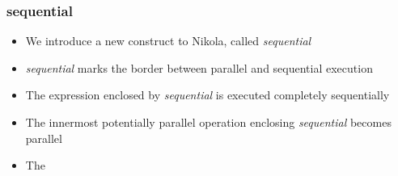 \documentclass[a4paper]{beamer}
\begin{document}
\begin{frame}
  \frametitle{sequential}


  \begin{itemize}
    \item We introduce a new construct to Nikola, called \emph{sequential}
    \item \emph{sequential} marks the border between parallel and sequential execution
    \item The expression enclosed by \emph{sequential} is executed completely sequentially
    \item The innermost potentially parallel operation enclosing \emph{sequential} becomes parallel
    \item The
  \end{itemize}
\end{frame}
\end{document}
